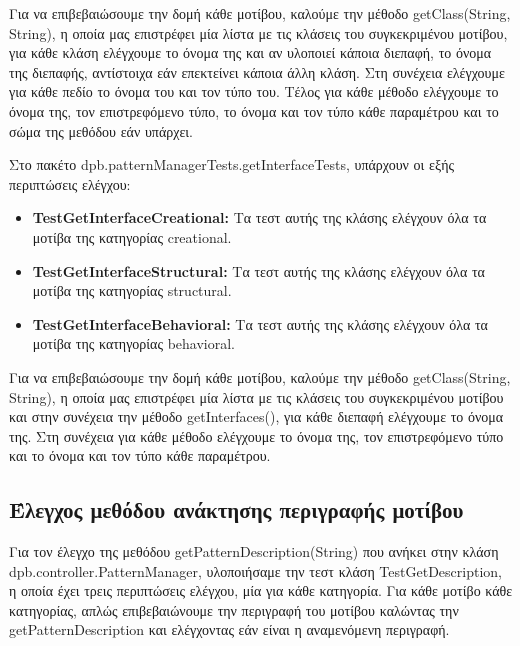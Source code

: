 \par
Για να επιβεβαιώσουμε την δομή κάθε μοτίβου, καλούμε την μέθοδο getClass(String, String), η οποία μας επιστρέφει 
μία λίστα με τις κλάσεις του συγκεκριμένου μοτίβου, για κάθε κλάση ελέγχουμε το όνομα της και αν υλοποιεί κάποια διεπαφή, 
το όνομα της διεπαφής, αντίστοιχα εάν επεκτείνει κάποια άλλη κλάση. Στη συνέχεια ελέγχουμε για κάθε πεδίο το όνομα του και 
τον τύπο του. Τέλος για κάθε μέθοδο ελέγχουμε το όνομα της, τον επιστρεφόμενο τύπο, 
το όνομα και τον τύπο κάθε παραμέτρου και το σώμα της μεθόδου εάν υπάρχει.
\par
Στο πακέτο dpb.patternManagerTests.getInterfaceTests, υπάρχουν οι εξής περιπτώσεις ελέγχου:
\begin{itemize}
    \item \textbf{TestGetInterfaceCreational:} Τα τεστ αυτής της κλάσης ελέγχουν όλα τα μοτίβα της κατηγορίας creational.
    \item \textbf{TestGetInterfaceStructural:} Τα τεστ αυτής της κλάσης ελέγχουν όλα τα μοτίβα της κατηγορίας structural.
    \item \textbf{TestGetInterfaceBehavioral:} Τα τεστ αυτής της κλάσης ελέγχουν όλα τα μοτίβα της κατηγορίας behavioral.
\end{itemize}
\par
Για να επιβεβαιώσουμε την δομή κάθε μοτίβου, καλούμε την μέθοδο getClass(String, String), η οποία μας επιστρέφει 
μία λίστα με τις κλάσεις του συγκεκριμένου μοτίβου και στην συνέχεια την μέθοδο getInterfaces(), για κάθε διεπαφή 
ελέγχουμε το όνομα της. Στη συνέχεια για κάθε μέθοδο ελέγχουμε το όνομα της, τον επιστρεφόμενο τύπο και
το όνομα και τον τύπο κάθε παραμέτρου.
\subsection{Έλεγχος μεθόδου ανάκτησης περιγραφής μοτίβου}
\label{subsec:getDescriptionTest}
Για τον έλεγχο της μεθόδου getPatternDescription(String) που ανήκει στην κλάση dpb.controller.PatternManager, υλοποιήσαμε την τεστ κλάση
TestGetDescription, η οποία έχει τρεις περιπτώσεις ελέγχου, μία για κάθε κατηγορία. Για κάθε μοτίβο κάθε κατηγορίας,
απλώς επιβεβαιώνουμε την περιγραφή του μοτίβου καλώντας την getPatternDescription και ελέγχοντας εάν είναι η αναμενόμενη περιγραφή.
